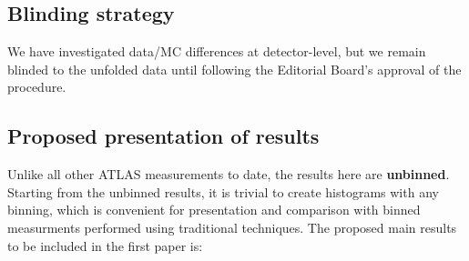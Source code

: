 \subsection{Blinding strategy}

We have investigated data/MC differences at detector-level, but we remain blinded to the unfolded data until following the Editorial Board's approval of the procedure.

\subsection{Proposed presentation of results}
\label{sec:pres}

Unlike all other ATLAS measurements to date, the results here are \textbf{unbinned}.
Starting from the unbinned results, it is trivial to create histograms with any binning, which is convenient for presentation and comparison with binned measurments performed using traditional techniques.
The proposed main results to be included in the first paper is:


